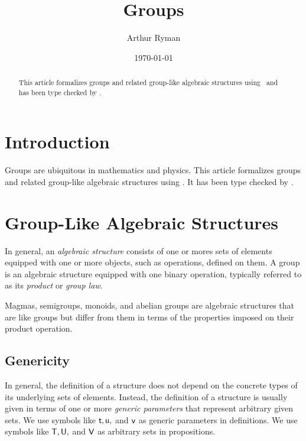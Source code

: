 \documentclass{amsart}
\begin{document}
\title{Groups}
\author{Arthur Ryman}
\date{\today}

\begin{abstract}
	This article formalizes groups and related group-like algebraic structures using 
	\ZN\ and has been type checked by \fuzz.
\end{abstract}

\maketitle

\tableofcontents

\section{Introduction}

Groups are ubiquitous in mathematics and physics.
This article formalizes groups and related group-like algebraic structures using 
\ZN\cite{spivey-zrm}.
It has been type checked by \fuzz\cite{spivey-fm}.

\section{Group-Like Algebraic Structures}

In general, an \textit{algebraic structure} consists of one or mores sets of elements 
equipped with one or more objects, such as operations, defined on them.
A group is an algebraic structure equipped with one binary operation, typically referred to
as its \textit{product} or \textit{group law}.

Magmas, semigroups, monoids, and abelian groups are 
algebraic structures that are like groups but differ from them 
in terms of the properties imposed on their product operation.

\subsection{Genericity}

In general, the definition of a structure does not depend on the concrete types
of its underlying sets of elements.
Instead, the definition of a structure is usually given in terms of one or more \textit{generic parameters}
that represent arbitrary given sets.
We use symbols like $\mathsf{t}, \mathsf{u},$  and $\mathsf{v}$ as generic parameters in definitions. 
We use symbols like $\mathsf{T}, \mathsf{U},$ and $\mathsf{V}$ as arbitrary sets in propositions.
\end{document}
